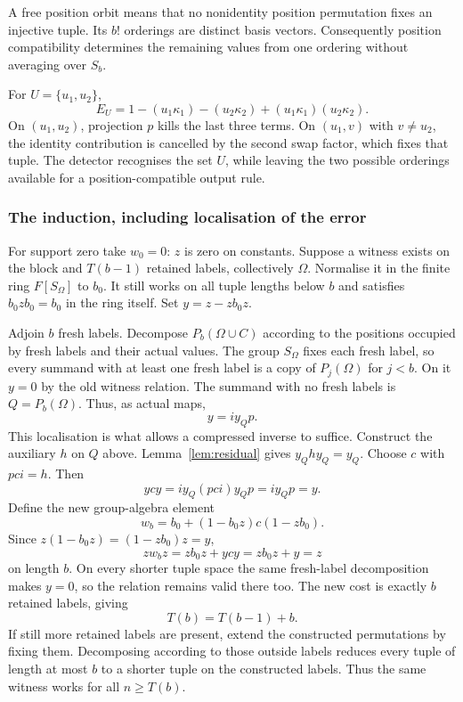 A free position orbit means that no nonidentity position permutation
fixes an injective tuple. Its $b!$ orderings are distinct basis vectors.
Consequently position compatibility determines the remaining values
from one ordering without averaging over $S_b$.

\begin{example}
For $U=\{u_1,u_2\}$,
\[E_U=1-(u_1\kappa_1)-(u_2\kappa_2)+(u_1\kappa_1)(u_2\kappa_2).
\]
On $(u_1,u_2)$, projection $p$ kills the last three terms. On $(u_1,v)$ with $v\ne u_2$, the identity contribution is cancelled by the second swap factor, which fixes that tuple. The detector recognises the set $U$, while leaving the two possible orderings available for a position-compatible output rule.
\end{example}

\subsubsection{The induction, including localisation of the error}
For support zero take $w_0=0$: $z$ is zero on constants. Suppose a witness exists on the block and $T(b-1)$ retained labels, collectively $\Omega$. Normalise it in the finite ring $F[S_\Omega]$ to $b_0$. It still works on all tuple lengths below $b$ and satisfies $b_0zb_0=b_0$ in the ring itself. Set $y=z-zb_0z$.

Adjoin $b$ fresh labels. Decompose $P_b(\Omega\cup C)$ according to the positions occupied by fresh labels and their actual values. The group $S_\Omega$ fixes each fresh label, so every summand with at least one fresh label is a copy of $P_j(\Omega)$ for $j<b$. On it $y=0$ by the old witness relation. The summand with no fresh labels is $Q=P_b(\Omega)$. Thus, as actual maps,
\[y=i y_Q p.\]
This localisation is what allows a compressed inverse to suffice. Construct the auxiliary $h$ on $Q$ above. Lemma~\ref{lem:residual} gives $y_Qhy_Q=y_Q$. Choose $c$ with $pci=h$. Then
\[ycy=i y_Q(pci)y_Qp=i y_Qp=y.\]
Define the new group-algebra element
\[w_b=b_0+(1-b_0z)c(1-zb_0).\]
Since $z(1-b_0z)=(1-zb_0)z=y$,
\[zw_bz=zb_0z+ycy=zb_0z+y=z\]
on length $b$. On every shorter tuple space the same fresh-label decomposition makes $y=0$, so the relation remains valid there too. The new cost is exactly $b$ retained labels, giving
\[T(b)=T(b-1)+b.\]
If still more retained labels are present, extend the constructed permutations by fixing them. Decomposing according to those outside labels reduces every tuple of length at most $b$ to a shorter tuple on the constructed labels. Thus the same witness works for all $n\ge T(b)$.

